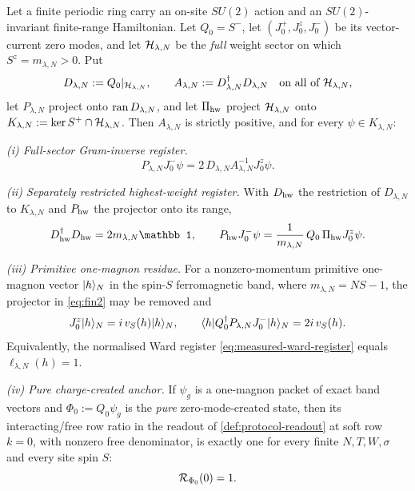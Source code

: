 \begin{theorem}
\label{thm:soft-index-su2}
\statusProved

Let a finite periodic ring carry an on-site $SU(2)$ action and an
$SU(2)$-invariant finite-range Hamiltonian. Let $Q_0=S^-$, let
$(J^+_0,J^z_0,J^-_0)$ be its vector-current zero modes, and let
$\mathcal{H}_{\lambda,N}$ be the \emph{full} weight sector on which
$S^z=m_{\lambda,N}>0$. Put
\[
  D_{\lambda,N}:=Q_0|_{\mathcal{H}_{\lambda,N}},\qquad
  A_{\lambda,N}:=D_{\lambda,N}^\dagger D_{\lambda,N}
  \quad\text{on all of }\mathcal{H}_{\lambda,N},
\]
let $P_{\lambda,N}$ project onto $\operatorname{ran} D_{\lambda,N}$, and let $\Pi_{\rm hw}$
project $\mathcal{H}_{\lambda,N}$ onto
$K_{\lambda,N}:=\ker S^+\cap\mathcal{H}_{\lambda,N}$. Then $A_{\lambda,N}$ is
strictly positive, and for every $\psi\in K_{\lambda,N}$:

\emph{(i) Full-sector Gram-inverse register.}
\begin{equation}
  P_{\lambda,N}J^-_0\psi=2\,D_{\lambda,N}A_{\lambda,N}^{-1}J^z_0\psi.
  \label{eq:fin1}
\end{equation}

\emph{(ii) Separately restricted highest-weight register.} With $D_{\rm hw}$
the restriction of $D_{\lambda,N}$ to $K_{\lambda,N}$ and $P_{\rm hw}$ the
projector onto its range,
\begin{equation}
  D_{\rm hw}^\dagger D_{\rm hw}=2m_{\lambda,N}\mathbb 1,
  \qquad
  P_{\rm hw}J^-_0\psi=\frac{1}{m_{\lambda,N}}\,Q_0\,\Pi_{\rm hw}J^z_0\psi.
  \label{eq:fin2}
\end{equation}

\emph{(iii) Primitive one-magnon residue.} For a nonzero-momentum primitive
one-magnon vector $|h\rangle_N$ in the spin-$S$ ferromagnetic band, where
$m_{\lambda,N}=NS-1$, the projector in \cref{eq:fin2} may be removed and
\begin{equation}
  J^z_0|h\rangle_N=i\,v_S(h)|h\rangle_N,
  \qquad
  \langle h|Q_0^\dagger P_{\lambda,N}J^-_0|h\rangle_N=2i\,v_S(h).
  \label{eq:fin3}
\end{equation}
Equivalently, the normalised Ward register
\cref{eq:measured-ward-register} equals $\ell_{\lambda,N}(h)=1$.

\emph{(iv) Pure charge-created anchor.} If $\psi_g$ is a one-magnon packet of
exact band vectors and $\Phi_0:=Q_0\psi_g$ is the \emph{pure} zero-mode-created
state, then its interacting/free row ratio in the readout of
\cref{def:protocol-readout} at soft row $k=0$, with nonzero free denominator,
is exactly one for every finite $N,T,W,\sigma$ and every site spin $S$:
\begin{equation}
  \mathcal{R}_{\Phi_0}(0)=1.
  \label{eq:fin8}
\end{equation}
\end{theorem}

